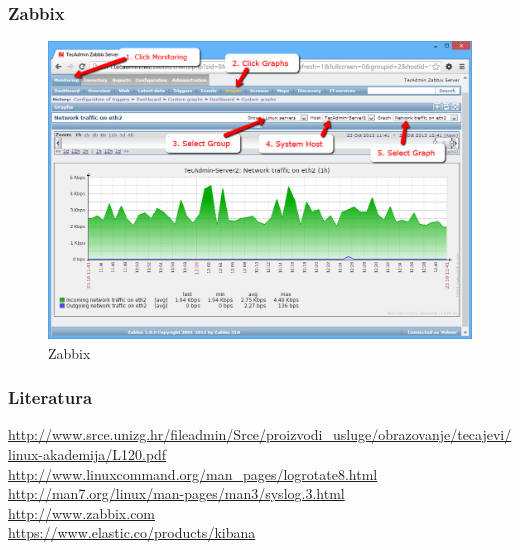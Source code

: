 \documentclass[t,table,usenames,dvipsnames]{beamer}
\begin{document}
\begin{frame}
	\frametitle{Zabbix}
	\begin{figure}
		\centering
		\includegraphics[width=0.7\linewidth]{graph-network}
		\caption{Zabbix}
		\label{fig:graph-network}
	\end{figure}
	
\end{frame}


\begin{frame}
	\frametitle{Literatura}
	\url{http://www.srce.unizg.hr/fileadmin/Srce/proizvodi_usluge/obrazovanje/tecajevi/linux-akademija/L120.pdf}
	\vfill
	\url{http://www.linuxcommand.org/man_pages/logrotate8.html}\\
	\url{http://man7.org/linux/man-pages/man3/syslog.3.html}\\
	\vfill
	\url{http://www.zabbix.com}\\
	\vfill
	\url{https://www.elastic.co/products/kibana}\\
\end{frame}
\end{document}
